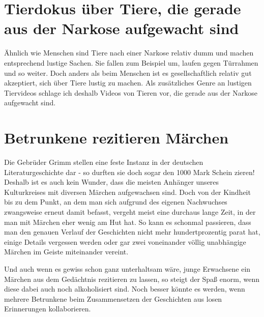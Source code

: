 \documentclass[a5paper,pagesize,10pt,bibtotoc,pointlessnumbers,normalheadings,DIV=9,twoside=false]{scrbook}
\begin{document}

\chapter{Tierdokus über Tiere, die gerade aus der Narkose aufgewacht sind}

Ähnlich wie Menschen sind Tiere nach einer Narkose relativ dumm und machen entsprechend lustige Sachen.
Sie fallen zum Beispiel um, laufen gegen Türrahmen und so weiter.
Doch anders als beim Menschen ist es gesellschaftlich relativ gut akzeptiert, sich über Tiere lustig zu machen.
Als zusätzliches Genre an lustigen Tiervideos schlage ich deshalb Videos von Tieren vor, die gerade aus der Narkose aufgewacht sind.

\chapter{Betrunkene rezitieren Märchen}

Die Gebrüder Grimm stellen eine feste Instanz in der deutschen Literaturgeschichte dar - so durften sie doch sogar den 1000 Mark Schein zieren!
Deshalb ist es auch kein Wunder, dass die meisten Anhänger unseres Kulturkreises mit diversen Märchen aufgewachsen sind.
Doch von der Kindheit bis zu dem Punkt, an dem man sich aufgrund des eigenen Nachwuchses zwangsweise erneut damit befasst, vergeht meist eine durchaus lange Zeit, in der man mit Märchen eher wenig am Hut hat.
So kann es schonmal passieren, dass man den genauen Verlauf der Geschichten nicht mehr hundertprozentig parat hat, einige Details vergessen werden oder gar zwei voneinander völlig unabhängige Märchen im Geiste miteinander vereint.

Und auch wenn es gewiss schon ganz unterhaltsam wäre, junge Erwachsene ein Märchen aus dem Gedächtnis rezitieren zu lassen, so steigt der Spaß enorm, wenn diese dabei auch noch alkoholisiert sind.
Noch besser könnte es werden, wenn mehrere Betrunkene beim Zusammensetzen der Geschichten aus losen Erinnerungen kollaborieren.
\end{document}
